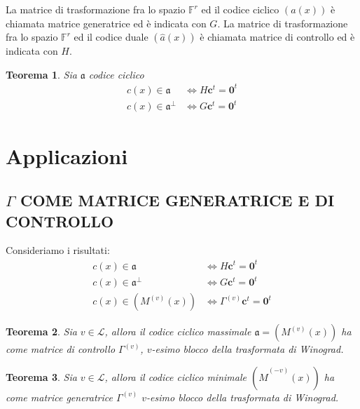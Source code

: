 \documentclass[mathserif]{beamer}
\newtheorem{teorema}{Teorema}
\begin{document}
\begin{frame}
  La matrice di trasformazione fra lo spazio $\mathbb{F}^{r}$ ed il codice ciclico $(a(x))$ è chiamata matrice generatrice ed è indicata con $G$.
  La matrice di trasformazione fra lo spazio $\mathbb{F}^{r}$ ed il codice duale $(\hat{a}(x))$ è chiamata matrice di controllo ed è indicata con $H$.
  \begin{teorema}
     Sia $\mathfrak{a} $ codice ciclico
     \begin{align*}
	c(x) \in \mathfrak{a} &\iff H \mathbf{c}^{t} = \mathbf{0}^{t}  \\
	c(x) \in \mathfrak{a}^{\perp} &\iff G \mathbf{c}^{t} = \mathbf{0}^{t}
      \end{align*}
  \end{teorema}
\end{frame}





\section{Applicazioni}
\subsection{$\Gamma$ COME MATRICE GENERATRICE E DI CONTROLLO}
\begin{frame}
  Consideriamo i risultati:
      \begin{align*}
      c(x) \in \mathfrak{a} &\iff H \mathbf{c}^{t} = \mathbf{0}^{t}  \\
      c(x) \in \mathfrak{a}^{\perp} &\iff G \mathbf{c}^{t} = \mathbf{0}^{t} \\
      c(x) \in (M^{(v)}(x)) &\iff \Gamma^{(v)} \mathbf{c}^{t} = \mathbf{0}^{t}
    \end{align*}
   \begin{teorema}
      Sia $v \in \mathscr{L}$, allora il codice ciclico massimale $\mathfrak{a} = (M^{(v)}(x))$ ha come matrice di controllo $\Gamma^{(v)} $, $v$-esimo blocco della trasformata di Winograd.
    \end{teorema}
    \begin{teorema}
      Sia $v \in \mathscr{L}$, allora il codice ciclico minimale $(\hat{M}^{(-v)}(x))$ ha come matrice generatrice $\Gamma^{(v)} $ $v$-esimo blocco della trasformata di Winograd.
    \end{teorema}
\end{frame}
\end{document}

